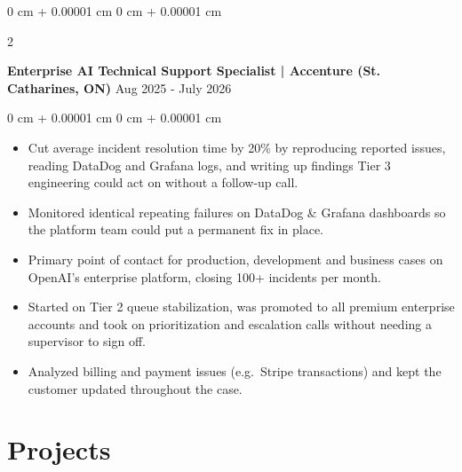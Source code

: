 \documentclass[10pt, letterpaper]{article}
\newenvironment{highlights}{
    \begin{itemize}[
        topsep=0.10 cm,
        parsep=0.10 cm,
        partopsep=0pt,
        itemsep=0pt,
        leftmargin=0 cm + 10pt
    ]
}{
    \end{itemize}
} %
\newenvironment{onecolentry}{
    \begin{adjustwidth}{
        0 cm + 0.00001 cm
    }{
        0 cm + 0.00001 cm
    }
}{
    \end{adjustwidth}
} %
\newenvironment{twocolentry}[2][]{
    \onecolentry
    \def\secondColumn{#2}
    \setcolumnwidth{\fill, 4.5 cm}
    \begin{paracol}{2}
}{
    \switchcolumn \raggedleft \secondColumn
    \end{paracol}
    \endonecolentry
} %
\begin{document}
        \begin{twocolentry}{
            {Aug 2025 - July 2026}
        }
            \textbf{Enterprise AI Technical Support Specialist | Accenture (St. Catharines, ON)}\end{twocolentry}
        \vspace{0.10 cm}
        \begin{onecolentry}
            \begin{highlights}
                \item Cut average incident resolution time by 20\% by reproducing reported issues, reading DataDog and Grafana logs, and writing up findings Tier 3 engineering could act on without a follow-up call.
                \item Monitored identical repeating failures on DataDog \& Grafana dashboards so the platform team could put a permanent fix in place.
                \item Primary point of contact for production, development and business cases on OpenAI's enterprise platform, closing 100+ incidents per month.
                \item Started on Tier 2 queue stabilization, was promoted to all premium enterprise accounts and took on prioritization and escalation calls without needing a supervisor to sign off.
                \item Analyzed billing and payment issues (e.g.\ Stripe transactions) and kept the customer updated throughout the case.
            \end{highlights}
        \end{onecolentry}

    \section{Projects}
\end{document}
